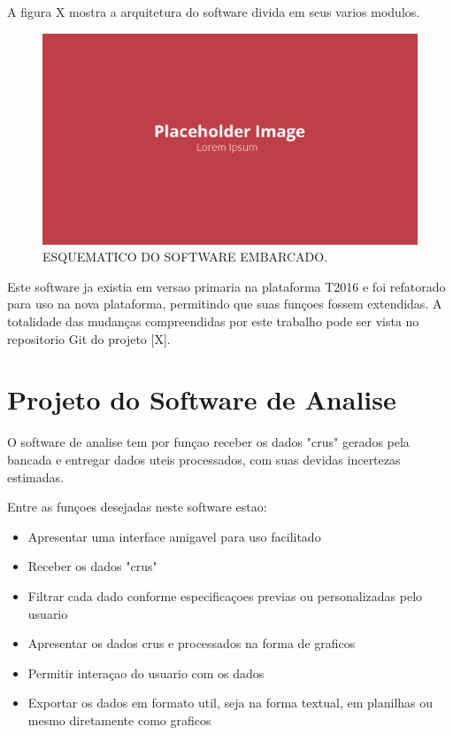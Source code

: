 A figura X mostra a arquitetura do software divida em seus varios modulos.

\begin{figure}[!ht]
    \centering
    \includegraphics[width=.8\linewidth]{figuras/placeholder.png}
    \caption{ESQUEMATICO DO SOFTWARE EMBARCADO\cite{autor}.}
    \label{fig:placeholder}
\end{figure}

Este software ja existia em versao primaria na plataforma T2016 e foi refatorado para uso na nova plataforma, permitindo que suas funçoes fossem extendidas. A totalidade das mudanças compreendidas por este trabalho pode ser vista no repositorio Git do projeto [X]. 
\section{Projeto do Software de Analise}

O software de analise tem por funçao receber os dados "crus" gerados pela bancada e entregar dados uteis processados, com suas devidas incertezas estimadas.

Entre as funçoes desejadas neste software estao:

\begin{itemize}
    \item Apresentar uma interface amigavel para uso facilitado
    \item Receber os dados "crus"
    \item Filtrar cada dado conforme especificaçoes previas ou personalizadas pelo usuario
    \item Apresentar os dados crus e processados na forma de graficos
    \item Permitir interaçao do usuario com os dados
    \item Exportar os dados em formato util, seja na forma textual, em planilhas ou mesmo diretamente como graficos
\end{itemize}

